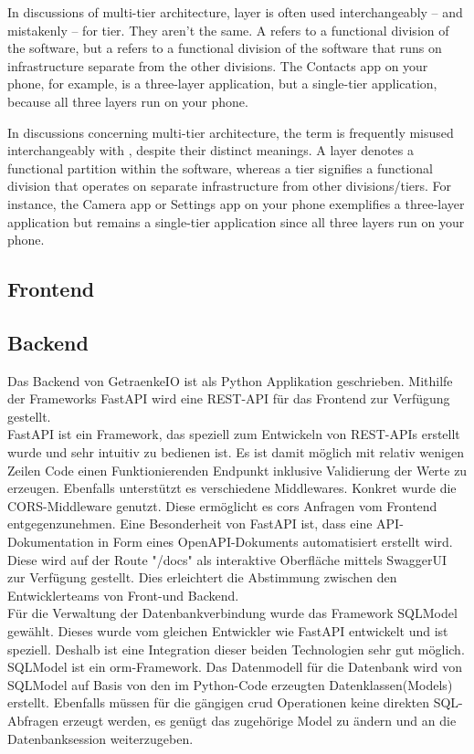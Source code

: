 \documentclass[conference,a4paper]{cs-techrep}
\begin{document}
In discussions of multi-tier architecture, layer is often used interchangeably -- and mistakenly -- for tier. They aren't the same. A  refers to a functional division of the software, but a  refers to a functional division of the software that runs on infrastructure separate from the other divisions. The Contacts app on your phone, for example, is a three-layer application, but a single-tier application, because all three layers run on your phone.

In discussions concerning multi-tier architecture, the term  is frequently misused interchangeably with , despite their distinct meanings. A layer denotes a functional partition within the software, whereas a tier signifies a functional division that operates on separate infrastructure from other divisions/tiers. For instance, the Camera app or Settings app on your phone exemplifies a three-layer application but remains a single-tier application since all three layers run on your phone.


\subsection{Frontend}
\lipsum[3]

\subsection{Backend} %
Das Backend von GetraenkeIO ist als Python Applikation geschrieben.
Mithilfe der Frameworks FastAPI wird eine REST-API für das Frontend zur Verfügung gestellt. \\  
FastAPI ist ein Framework, das speziell zum Entwickeln von REST-APIs erstellt wurde und sehr intuitiv zu bedienen ist.
Es ist damit möglich mit relativ wenigen Zeilen Code einen Funktionierenden Endpunkt inklusive Validierung der Werte zu erzeugen. Ebenfalls unterstützt es verschiedene Middlewares. Konkret wurde die CORS-Middleware genutzt. Diese ermöglicht es \ac{cors} Anfragen vom Frontend entgegenzunehmen.
Eine Besonderheit von FastAPI ist, dass eine API-Dokumentation in Form eines OpenAPI-Dokuments \cite{openapi} automatisiert erstellt wird. Diese wird auf der Route "/docs" als interaktive Oberfläche mittels SwaggerUI \cite{swagger} zur Verfügung gestellt. Dies erleichtert die Abstimmung zwischen den Entwicklerteams von Front-und Backend. \\  
Für die Verwaltung der Datenbankverbindung wurde das Framework SQLModel gewählt. Dieses wurde vom gleichen Entwickler wie FastAPI entwickelt und ist speziell. Deshalb ist eine Integration dieser beiden Technologien sehr gut möglich. SQLModel ist ein \ac{orm}-Framework.
Das Datenmodell für die Datenbank wird von SQLModel auf Basis von den im Python-Code erzeugten Datenklassen(Models) erstellt. Ebenfalls müssen für die gängigen \ac{crud} Operationen keine direkten SQL-Abfragen erzeugt werden, es genügt das zugehörige Model  zu ändern und an die Datenbanksession weiterzugeben.
\end{document}
